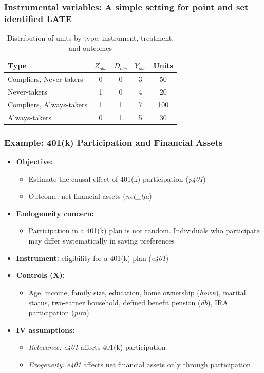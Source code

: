 \documentclass[12pt, compress]{beamer}
\begin{document}
\begin{frame}
	\frametitle{Instrumental variables: A simple setting for point and set identified LATE}
\begin{table}[ht]
	\centering
	\caption{Distribution of units by type, instrument, treatment, and outcomes}
	\label{tab:types}
	\begin{tabular}{lcccc}
		\hline
		Type & $Z_{obs}$ & $D_{obs}$ & $Y_{obs}$ & Units \\
		\hline
		Compliers, Never-takers & 0 & 0 & 3 & 50 \\
		Never-takers   & 1 & 0 & 4 & 20  \\
		Compliers, Always-takers & 1 & 1 & 7 & 100  \\
		 Always-takers   & 0 & 1 & 5 & 30  \\
		\hline
	\end{tabular}
\end{table}
\end{frame}

\begin{frame}
	\frametitle{Example: 401(k) Participation and Financial Assets}

\begin{itemize}
	\item \textbf{Objective:}
	\begin{itemize}
		\item Estimate the causal effect of 401(k) participation (\textit{p401})
		\item Outcome: net financial assets (\textit{net\_tfa})
	\end{itemize}

	
	\item \textbf{Endogeneity concern:}
	\begin{itemize}
		\item Participation in a 401(k) plan is not random. Individuals who participate may differ systematically in saving preferences
	\end{itemize}

	\item \textbf{Instrument:} eligibility for a 401(k) plan (\textit{e401})

	\item \textbf{Controls ($\mathbf{X}$):}
	\begin{itemize}
		\item Age, income, family size, education, home ownership (\textit{hown}), marital status, two-earner household, defined benefit pension (\textit{db}), IRA participation (\textit{pira})
	\end{itemize}
	
	\item \textbf{IV assumptions:}
	\begin{itemize}
		\item \textit{Relevance:} \textit{e401} affects 401(k) participation
		\item \textit{Exogeneity:} \textit{e401} affects net financial assets only through participation
	\end{itemize}
\end{itemize}

\end{frame}
\end{document}
